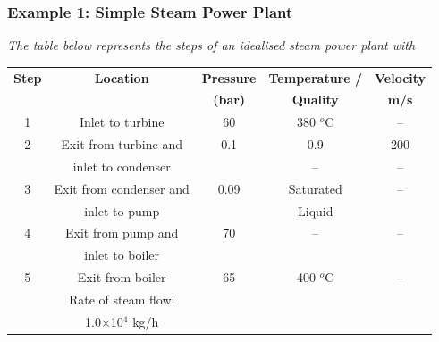 \documentclass[10pt,compress]{beamer}
\begin{document}
\begin{frame}
 \frametitle{Example 1: Simple Steam Power Plant}
    {\it The table below represents the steps of an idealised steam power plant with
    \begin{center}
     \begin{tabular}{||c | c | c | c | c ||}
      \hline\hline
       {\bf Step} & {\bf Location}       & {\bf Pressure}  & {\bf Temperature /}   & {\bf Velocity} \\
                  &                      & {\bf (bar)}     & {\bf Quality}         & {\bf m/s}      \\
      \hline\hline
          1       & Inlet to turbine     &   60            &   380 $^{o}$C          &   --           \\
      \hline
          2       & Exit from turbine and&   0.1           &   0.9                 & 200             \\
                  & inlet to condenser   &                 &    --                 &     --          \\ 
      \hline
          3       & Exit from condenser and&  0.09         &  Saturated            &   --            \\
                  & inlet to pump        &                 &  Liquid               &                 \\
      \hline
          4       & Exit from pump and   &  70             &   --                  &     --          \\
                  & inlet to boiler      &                 &                       &                 \\
      \hline 
          5       & Exit from boiler     &  65             &  400 $^{o}$C           &      --        \\
                  & Rate of steam flow:   &                 &                       &                 \\
                  & 1.0$\times$10$^{4}$ kg/h &             &                       &                 \\
     
      \hline\hline
     \end{tabular}
    \end{center}}
 \normalsize
\end{frame}
\end{document}
